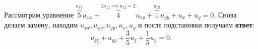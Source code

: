 \begin{example}
    Рассмотрим уравнение $\overbrace{5}^{a_{11}} u_{xx} + \overbrace{4}^{2 a_{12} \implies a_{12} = 2} u_{xy} + \overbrace{1}^{a_{22}} u_{yy} + u_x + u_y = 0$. Снова делаем замену, находим $u_{xx}, u_{xy}, u_{yy}, u_x, u_y$ и после подстановки получаем \textbf{ответ}:
    $$ u_{\xi \xi} + u_{\eta \eta} + \dfrac{3}{5} u_\xi + \dfrac{1}{5} u_\eta = 0. $$
\end{example}